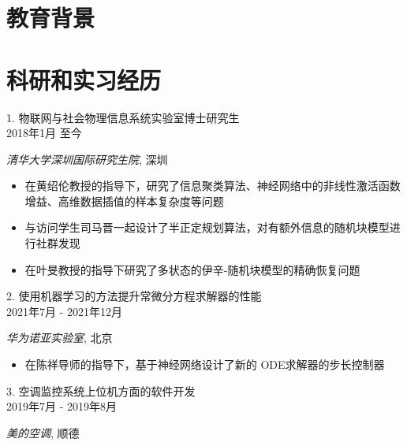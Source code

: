 \documentclass[12pt]{moderncv}
\begin{document}
\makecvtitle
\section{教育背景}
\section{科研和实习经历}

{\raggedright\large 1. 物联网与社会物理信息系统实验室博士研究生\\
\raggedleft\small \textsc{2018年1月 至今}\par\textit{清华大学深圳国际研究生院}, 深圳 \\[5pt]}

\normalsize{\begin{itemize}
		\item 在黄绍伦教授的指导下，研究了信息聚类算法、神经网络中的非线性激活函数增益、高维数据插值的样本复杂度等问题
		\item 与访问学生司马晋一起设计了半正定规划算法，对有额外信息的随机块模型进行社群发现
		\item 在叶旻教授的指导下研究了多状态的伊辛-随机块模型的精确恢复问题
\end{itemize}}

{\raggedright\large 2. 使用机器学习的方法提升常微分方程求解器的性能\\
\raggedleft\small \textsc{2021年7月 - 2021年12月}\par \textit{华为诺亚实验室}, 北京 \\[5pt]}

\normalsize{\begin{itemize}
		\item 在陈祥导师的指导下，基于神经网络设计了新的 ODE求解器的步长控制器
\end{itemize}}




{\raggedright\large 3. 空调监控系统上位机方面的软件开发 \\
\raggedleft\small \textsc{2019年7月 - 2019年8月}\par\textit{美的空调}, 顺德\\[5pt]}
\end{document}
